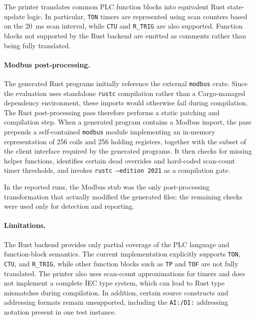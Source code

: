 \documentclass{ceurart}
\begin{document}
The printer translates common PLC function blocks into equivalent Rust state-update logic. In particular, \texttt{TON} timers are represented using scan counters based on the 20~ms scan interval, while \texttt{CTU} and \texttt{R\_TRIG} are also supported. Function blocks not supported by the Rust backend are emitted as comments rather than being fully translated.

\paragraph{Modbus post-processing.}

The generated Rust programs initially reference the external \texttt{modbus} crate. Since the evaluation uses standalone \texttt{rustc} compilation rather than a Cargo-managed dependency environment, these imports would otherwise fail during compilation. The Rust post-processing pass therefore performs a static patching and compilation step. When a generated program contains a Modbus import, the pass prepends a self-contained \texttt{modbus} module implementing an in-memory representation of 256 coils and 256 holding registers, together with the subset of the client interface required by the generated programs. It then checks for missing helper functions, identifies certain dead overrides and hard-coded scan-count timer thresholds, and invokes \texttt{rustc --edition 2021} as a compilation gate.

In the reported runs, the Modbus stub was the only post-processing transformation that actually modified the generated files; the remaining checks were used only for detection and reporting.

\paragraph{Limitations.}

The Rust backend provides only partial coverage of the PLC language and function-block semantics. The current implementation explicitly supports \texttt{TON}, \texttt{CTU}, and \texttt{R\_TRIG}, while other function blocks such as \texttt{TP} and \texttt{TOF} are not fully translated. The printer also uses scan-count approximations for timers and does not implement a complete IEC type system, which can lead to Rust type mismatches during compilation. In addition, certain source constructs and addressing formats remain unsupported, including the \texttt{AI:/DI:} addressing notation present in one test instance.
\end{document}
